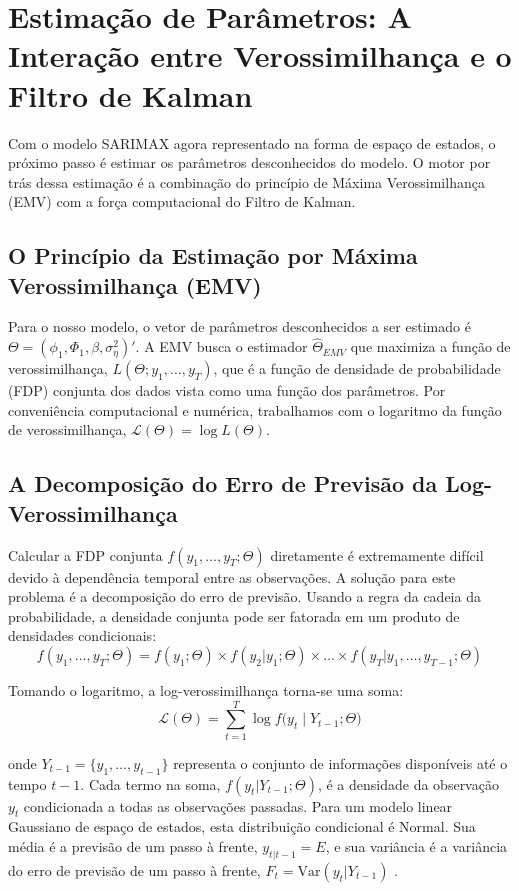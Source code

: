 \documentclass[ 12pt,a4paper ]{article} %
\begin{document}
		\section{Estimação de Parâmetros: A Interação entre Verossimilhança e o Filtro de Kalman}
	
	Com o modelo SARIMAX agora representado na forma de espaço de estados, o próximo passo é estimar os parâmetros desconhecidos do modelo. O motor por trás dessa estimação é a combinação do princípio de Máxima Verossimilhança (EMV) com a força computacional do Filtro de Kalman. 
	
	\subsection{O Princípio da Estimação por Máxima Verossimilhança (EMV)}
	
	Para o nosso modelo, o vetor de parâmetros desconhecidos a ser estimado é $\Theta = (\phi_1, \Phi_1, \beta, \sigma^2_\eta)'$. A EMV busca o estimador $\hat{\Theta}_{EMV}$ que maximiza a função de verossimilhança, $L(\Theta; y_1, \dots, y_T)$, que é a função de densidade de probabilidade (FDP) conjunta dos dados vista como uma função dos parâmetros. Por conveniência computacional e numérica, trabalhamos com o logaritmo da função de verossimilhança, $\mathcal{L}(\Theta) = \log L(\Theta)$.
	
	\subsection{A Decomposição do Erro de Previsão da Log-Verossimilhança}
	
	Calcular a FDP conjunta $f(y_1, \dots, y_T; \Theta)$ diretamente é extremamente difícil devido à dependência temporal entre as observações. A solução para este problema é a decomposição do erro de previsão. Usando a regra da cadeia da probabilidade, a densidade conjunta pode ser fatorada em um produto de densidades condicionais:
	$$ f(y_1, \dots, y_T; \Theta) = f(y_1; \Theta) \times f(y_2|y_1; \Theta) \times \dots \times f(y_T|y_1, \dots, y_{T-1}; \Theta) $$
	
	Tomando o logaritmo, a log-verossimilhança torna-se uma soma:
	$$\mathcal{L}(\Theta) = \sum_{t=1}^T \log f\bigl(y_t \mid Y_{t-1}; \Theta\bigr)$$
	
	onde $Y_{t-1} = \{y_1, \dots, y_{t-1}\}$ representa o conjunto de informações disponíveis até o tempo $t-1$. Cada termo na soma, $f(y_t | Y_{t-1}; \Theta)$, é a densidade da observação $y_t$ condicionada a todas as observações passadas. Para um modelo linear Gaussiano de espaço de estados, esta distribuição condicional é Normal. Sua média é a previsão de um passo à frente, $y_{t|t-1} = E$, e sua variância é a variância do erro de previsão de um passo à frente, $F_t = \text{Var}(y_t | Y_{t-1})$ \cite{Francke}. %
	
\end{document}
